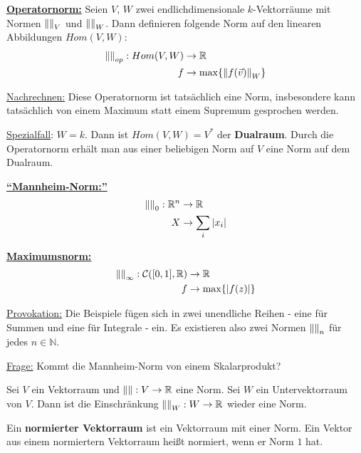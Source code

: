 \documentclass{report}
\newcommand*{\newpar}{\par\vspace{\baselineskip}\noindent}
\newcommand{\tbf}[1]{\textbf{#1}}
\newcommand{\ul}[1]{\underline{#1}}
\newcommand{\bN}{\mathbb{N}}
\newcommand{\bR}{\mathbb{R}}
\newcommand{\vv}{\vec{v}}
\begin{document}
\begin{beispiel}
 \tbf{\ul{Operatornorm:}}
 Seien $V$, $W$ zwei endlichdimensionale $k$-Vektorräume mit Normen $\norm{}_V$ und $\norm{}_W$. Dann definieren folgende Norm auf den linearen Abbildungen $Hom(V,W)$:
 \begin{align*}
  \norm{}_{op} : Hom(V,W) &\to \bR\\
  f &\to \max \{\norm{f(\vv)}_W\}\\
 \end{align*}
\end{beispiel}
\newpar
 \ul{Nachrechnen:} Diese Operatornorm ist tatsächlich eine Norm, insbesondere kann tatsächlich von einem Maximum statt einem Supremum gesprochen werden.
 \newpar
 \ul{Spezialfall}: $W = k$. Dann ist $Hom(V,W) = V^*$ der \tbf{Dualraum}. Durch die Operatornorm erhält man aus einer beliebigen Norm auf $V$ eine Norm auf dem Dualraum.
 \begin{beispiel}
 \tbf{\ul{``Mannheim-Norm:''}}
 \begin{align*}
  \norm{}_{0} : \bR^n &\to \bR\\
  X &\to \sum_{i} \abs{x_i}
 \end{align*}
 \end{beispiel}
  \begin{beispiel}
 \tbf{\ul{Maximumsnorm:}}
 \begin{align*}
  \norm{}_{\infty} : \mathcal{C}([0,1], \bR) &\to \bR\\
  f &\to \max \{|f(z)|\}
 \end{align*}
 \end{beispiel}
 \newpar
 \ul{Provokation:} Die Beispiele fügen sich in zwei unendliche Reihen - eine für Summen und eine für Integrale - ein. Es existieren also zwei Normen $\norm{}_n$ für jedes $n \in \bN$.
 \newpar
 \ul{Frage:} Kommt die Mannheim-Norm von einem Skalarprodukt?
 \begin{beispiel}
  Sei $V$ ein Vektorraum und $\norm{} : V \to \bR$ eine Norm. Sei $W$ ein Untervektorraum von $V$. Dann ist die Einschränkung $\norm{}_W : W \to \bR$ wieder eine Norm.
 \end{beispiel}
 \begin{definition}
  Ein \tbf{normierter Vektorraum} ist ein Vektorraum mit einer Norm. Ein Vektor aus einem normiertern Vektorraum heißt normiert, wenn er Norm $1$ hat.
 \end{definition}
\end{document}
